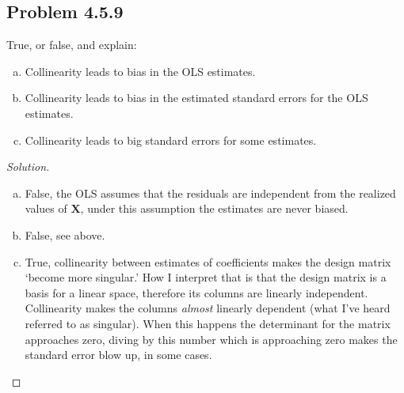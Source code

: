 \documentclass{amsart}\usepackage[]{graphicx}\usepackage[]{color}
\newcommand{\bvec}[1]{{\boldsymbol #1}}
\newcommand{\bX}{\bvec{X}}
\begin{document}
		\subsection*{Problem 4.5.9} %
		\label{ssub:problem_4_5_9}
			True, or false, and explain:
			\begin{enumerate}[(a)]
				\item Collinearity leads to bias in the OLS estimates.
				\item Collinearity leads to bias in the estimated standard errors for the OLS estimates.
				\item Collinearity leads to big standard errors for some estimates.
			\end{enumerate}
			\begin{proof}[Solution] \
				\begin{enumerate}[(a)]
					\item False, the OLS assumes that the residuals are independent from the realized values of $\bX$, under this assumption the estimates are never biased.
					\item False, see above.
					\item True, collinearity between estimates of coefficients makes the design matrix `become more singular.'
					How I interpret that is that the design matrix is a basis for a linear space, therefore its columns are linearly independent.
					Collinearity makes the columns \textit{almost} linearly dependent (what I've heard referred to as singular).
					When this happens the determinant for the matrix approaches zero, diving by this number which is approaching zero makes the standard error blow up, in some cases.
				\end{enumerate}
			\end{proof}
\end{document}
